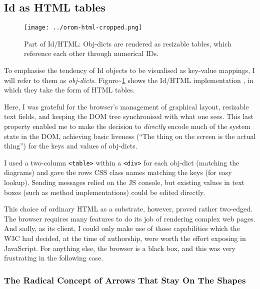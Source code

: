 \hypertarget{as-html-tables}{%
\subsection{\texorpdfstring{Id{} as HTML
tables}{ as HTML tables}}\label{as-html-tables}}

\begin{figure}[h]
  \centering
  \texttt{[image: ../orom-html-cropped.png]}
  \caption{Part of Id{}/HTML: Obj-dicts are rendered as resizable tables, which reference
           each other through numerical IDs. \label{fig:orom-html}}
\end{figure}

To emphasise the tendency of Id{} objects to be visualised as key-value
mappings, I will refer to them as \emph{obj-dicts}.
Figure\textasciitilde{}\ref{fig:orom-html} shows the Id{}/HTML
implementation \cite{orom-html}, in which they take the form of HTML
tables.

Here, I was grateful for the browser's management of graphical layout,
resizable text fields, and keeping the DOM tree synchronised with what
one sees. This last property enabled me to make the decision to
\emph{directly} encode much of the system state in the DOM, achieving
basic liveness (``The thing on the screen is the actual thing'') for the
keys and values of obj-dicts.

I used a two-column \texttt{\textless{}table\textgreater{}} within a
\texttt{\textless{}div\textgreater{}} for each obj-dict (matching the
diagrams) and gave the rows CSS class names matching the keys (for easy
lookup). Sending messages relied on the JS console, but existing values
in text boxes (such as method implementations) could be edited directly.

This choice of ordinary HTML as a substrate, however, proved rather
two-edged. The browser requires many features to do its job of rendering
complex web pages. And sadly, as its client, I could only make use of
those capabilities which the W3C had decided, at the time of authorship,
were worth the effort exposing in JavaScript. For anything else, the
browser is a black box, and this was very frustrating in the following
case.

\hypertarget{the-radical-concept-of-arrows-that-stay-on-the-shapes}{%
\subsubsection{The Radical Concept of Arrows That Stay On The
Shapes}\label{the-radical-concept-of-arrows-that-stay-on-the-shapes}}

